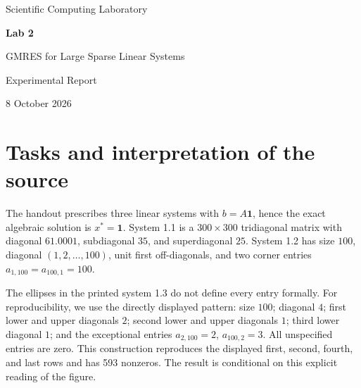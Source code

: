 \documentclass[a4paper,11pt]{article}
\begin{document}
\begin{titlepage}
\centering\vspace*{33mm}
{\Large Scientific Computing Laboratory\par}\vspace{12mm}
{\Huge\bfseries Lab 2\par}\vspace{5mm}
{\LARGE GMRES for Large Sparse Linear Systems\par}\vspace{14mm}
{\Large Experimental Report\par}
\vfill
{\large 8 October 2026\par}
\end{titlepage}

\begin{abstract}
This report reproduces all four tasks in the Lab 2 handout. Three prescribed sparse systems are solved with Gauss--Seidel, restarted GMRES, and ILU-preconditioned GMRES. A finite-difference boundary-value problem is solved on three grids with the two GMRES variants. We report true residuals, errors against known solutions, elapsed times, and solver-library cross-checks. At a common relative-residual target of $10^{-11}$, Gauss--Seidel diverges for system 1.2, whereas both GMRES variants converge. In the tridiagonal problems, the specified incomplete factorization is effectively exact and preconditioned GMRES finishes in one Krylov step. The boundary-value errors decrease at approximately second order as the grid is refined.
\end{abstract}

\section{Tasks and interpretation of the source}
The handout prescribes three linear systems with $b=A\mathbf{1}$, hence the exact algebraic solution is $x^*=\mathbf{1}$. System 1.1 is a $300\times300$ tridiagonal matrix with diagonal $61.0001$, subdiagonal $35$, and superdiagonal $25$. System 1.2 has size $100$, diagonal $(1,2,\ldots,100)$, unit first off-diagonals, and two corner entries $a_{1,100}=a_{100,1}=100$.

The ellipses in the printed system 1.3 do not define every entry formally. For reproducibility, we use the directly displayed pattern: size $100$; diagonal $4$; first lower and upper diagonals $2$; second lower and upper diagonals $1$; third lower diagonal $1$; and the exceptional entries $a_{2,100}=2$, $a_{100,2}=3$. All unspecified entries are zero. This construction reproduces the displayed first, second, fourth, and last rows and has 593 nonzeros. The result is conditional on this explicit reading of the figure.
\end{document}
